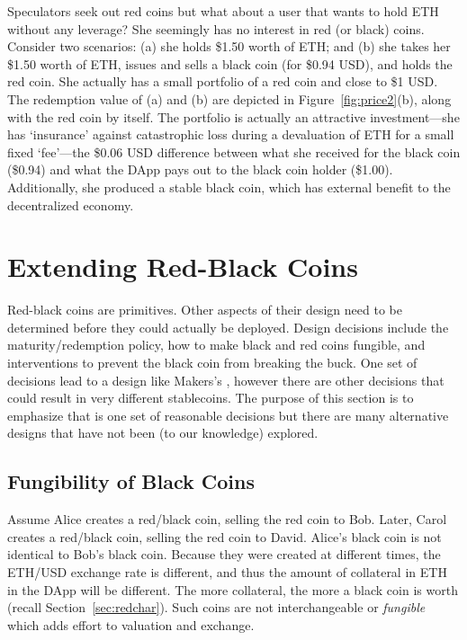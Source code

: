 Speculators seek out red coins but what about a user that wants to hold ETH without any leverage? She seemingly has no interest in red (or black) coins. Consider two scenarios: (a) she holds \$1.50 worth of ETH; and (b) she takes her \$1.50 worth of ETH, issues and sells a black coin (\eg for \$0.94 USD), and holds the red coin. She actually has a small portfolio of a red coin and close to \$1 USD. The redemption value of (a) and (b) are depicted in Figure~\ref{fig:price2}(b), along with the red coin by itself. The portfolio is actually an attractive investment---she has `insurance' against catastrophic loss during a devaluation of ETH for a small fixed `fee'---the \$0.06 USD difference between what she received for the black coin (\$0.94) and what the DApp pays out to the black coin holder (\$1.00). Additionally, she produced a stable black coin, which has external benefit to the decentralized economy. 



\section{Extending Red-Black Coins}

Red-black coins are primitives. Other aspects of their design need to be determined before they could actually be deployed. Design decisions include the maturity/redemption policy, how to make black and red coins fungible, and interventions to prevent the black coin from breaking the buck. One set of decisions lead to a design like Makers's \dai, however there are other decisions that could result in very different stablecoins. The purpose of this section is to emphasize that \dai is one set of reasonable decisions but there are many alternative designs that have not been (to our knowledge) explored.


\subsection{Fungibility of Black Coins}

Assume Alice creates a red/black coin, selling the red coin to Bob. Later, Carol creates a red/black coin, selling the red coin to David. Alice's black coin is not identical to Bob's black coin. Because they were created at different times, the ETH/USD exchange rate is different, and thus the  amount of collateral in ETH in the DApp will be different. The more collateral, the more a black coin is worth (recall Section~\ref{sec:redchar}). Such coins are not interchangeable or \textit{fungible} which adds effort to valuation and exchange. 

